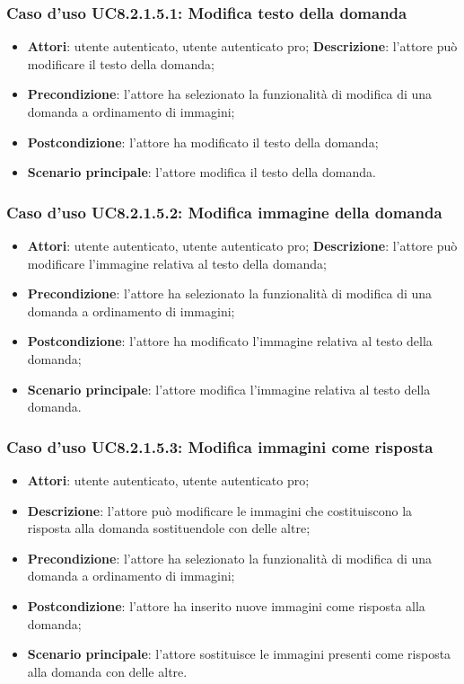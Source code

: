 \subsubsection{Caso d'uso UC8.2.1.5.1: Modifica testo della domanda}
\begin{itemize}
	\item\textbf{Attori}: utente autenticato, utente autenticato pro;
	\textbf{Descrizione}: l'attore può modificare il testo della domanda;
		\item
			\textbf{Precondizione}: l'attore ha selezionato la funzionalità di modifica di una domanda a ordinamento di immagini; 
		\item
			\textbf{Postcondizione}: l'attore ha modificato il testo della domanda;
		\item
			\textbf{Scenario principale}: l'attore modifica il testo della domanda.	
	\end{itemize}

\subsubsection{Caso d'uso UC8.2.1.5.2: Modifica immagine della domanda}
\begin{itemize}
	\item\textbf{Attori}: utente autenticato, utente autenticato pro;
	\textbf{Descrizione}: l'attore può modificare l'immagine relativa al testo della domanda;
		\item
			\textbf{Precondizione}: l'attore ha selezionato la funzionalità di modifica di una domanda a ordinamento di immagini; 
		\item
			\textbf{Postcondizione}: l'attore ha modificato l'immagine relativa al testo della domanda;
		\item
			\textbf{Scenario principale}: l'attore modifica l'immagine relativa al testo della domanda. 	
	\end{itemize}

\subsubsection{Caso d'uso UC8.2.1.5.3: Modifica immagini come risposta}
\begin{itemize}
	\item\textbf{Attori}: utente autenticato, utente autenticato pro;
	\item\textbf{Descrizione}: l'attore può modificare le immagini che costituiscono la risposta alla domanda sostituendole con delle altre;
	\item\textbf{Precondizione}: l'attore ha selezionato la funzionalità di modifica di una domanda a ordinamento di immagini;
	\item \textbf{Postcondizione}: l'attore ha inserito nuove immagini come risposta alla domanda;
	\item\textbf{Scenario principale}: l'attore sostituisce le immagini presenti come risposta alla domanda con delle altre.
\end{itemize}

